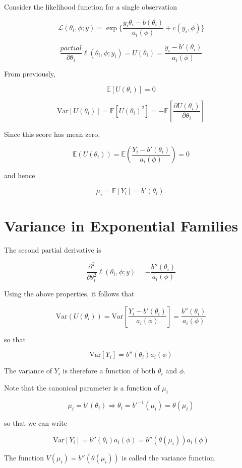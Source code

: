 \documentclass[
  letterpaper,
  DIV=11,
  numbers=noendperiod]{scrreport}
\begin{document}
Consider the likelihood function for a single observation

\[\mathcal L(\theta_i, \phi; y) = \exp \{ \frac{y_i \theta_i - b(\theta_i)}{a_i(\phi)} + c(y_i, \phi) \}\]

\[\frac{partial}{\partial \theta_i} \ell(\theta_i, \phi; y_i) = U(\theta_i) = \frac{y_i - b'(\theta_i)}{a_i(\phi)}\]

From previously,

\[\mathbb E[U(\theta_i)] = 0\]

\[\text{Var}[U(\theta_i)] = \mathbb E[U(\theta_i)^2] = -\mathbb E\left[ \frac{\partial U(\theta_i)}{\partial \theta_i} \right]\]

Since this score has mean zero,

\[\mathbb E(U(\theta_i)) = \mathbb E(\frac{Y_i - b'(\theta_i)}{a_i(\phi)}) = 0\]

and hence

\[\mu_i = \mathbb E[Y_i] = b'(\theta_i).\]

\hypertarget{variance-in-exponential-families}{%
\section{Variance in Exponential
Families}\label{variance-in-exponential-families}}

The second partial derivative is

\[\frac{\partial^2}{\partial \theta_i^2} \ell(\theta_i, \phi; y) = - \frac{b''(\theta_i)}{a_i(\phi)}\]

Using the above properties, it follows that

\[\text{Var}(U(\theta_i)) = \text{Var}\left[ \frac{Y_i - b'(\theta_i)}{a_i(\phi)} \right] = \frac{b''(\theta_i)}{a_i(\phi)}\]

so that

\[\text{Var}[Y_i] = b''(\theta_i)a_i(\phi)\]

The variance of \(Y_i\) is therefore a function of both \(\theta_i\) and
\(\phi\).

Note that the canonical parameter is a function of \(\mu_i\)

\[\mu_i = b'(\theta_i) \Rightarrow \theta_i = b'^{-1}(\mu_i) = \theta(\mu_i)\]

so that we can write

\[\text{Var}[Y_i] = b''(\theta_i)a_i(\phi) = b''(\theta(\mu_i))a_i(\phi)\]

The function \(V(\mu_i) = b''(\theta(\mu_i))\) is called the {variance
function}.
\end{document}
